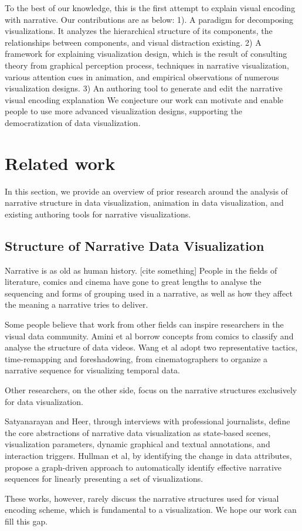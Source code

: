 \documentclass[review,journal]{vgtc}         %
\begin{document}
To the best of our knowledge, this is the first attempt to explain visual encoding with narrative. Our contributions are as below: 1). A paradigm for decomposing visualizations. It analyzes the hierarchical structure of its components, the relationships between components, and visual distraction existing. 2) A framework for explaining visualization design, which is the result of consulting theory from graphical perception process, techniques in narrative visualization, various attention cues in animation, and empirical observations of numerous visualization designs. 3) An authoring tool to generate and edit the narrative visual encoding explanation
 We conjecture our work can motivate and enable people to use more advanced visualization designs, supporting the democratization of data visualization.
 
\section {Related work}
In this section, we provide an overview of prior research around the analysis of narrative structure in data visualization, animation in data visualization, and existing authoring tools for narrative visualizations.\par
\subsection{Structure of Narrative Data Visualization}
Narrative is as old as human history. [cite something] People in the fields of literature, comics \cite{cohn_visual_2013} and cinema \cite{schmidt_living_2017} have gone to great lengths to analyse the sequencing and forms of grouping used in a narrative, as well as how they affect the meaning a narrative tries to deliver. \par
Some people believe that work from other fields can inspire researchers in the visual data community. Amini et al\cite{amini_understanding_2015} borrow concepts from comics \cite{cohn_visual_2013} to classify and analyse the structure of data videos. Wang et al \cite{wang_animated_2016} adopt two representative tactics, time-remapping and foreshadowing, from cinematographers to organize a narrative sequence for visualizing temporal data. \par
Other researchers, on the other side, focus on the narrative structures exclusively for data visualization. \par
Satyanarayan and Heer, through interviews with professional journalists\cite{satyanarayan_authoring_2014}, define the core abstractions of narrative data visualization as state-based scenes, visualization parameters, dynamic graphical and textual annotations, and interaction triggers. Hullman et al\cite{hullman_deeper_2013}, by identifying the change in data attributes, propose a graph-driven approach to automatically identify effective narrative sequences for linearly presenting a set of visualizations. \par
These works, however, rarely discuss the narrative structures used for visual encoding scheme, which is fundamental to a visualization. We hope our work can fill this gap.\par
\end{document}
